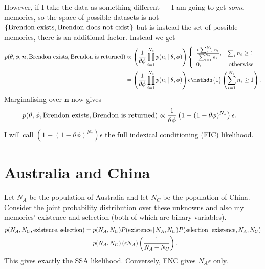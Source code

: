 \documentclass[a4paper, 12pt]{article}
\newcommand{\given}{\,|\,}
\begin{document}
However, if I take the data as something different --- I am going to get
{\em some} memories, so the space of possible datasets is not
$\{\textnormal{Brendon exists}, \textnormal{Brendon does not exist}\}$
but is instead the set of possible memories, there is an additional factor.
Instead we get 
\begin{align}
p(\theta, \phi, \boldsymbol{n}, \textnormal{Brendon exists},
  \textnormal{Brendon is returned}) &\propto
    \left(\frac{1}{\theta\phi}\prod_{i=1}^{N_*} p(n_i \given \theta, \phi)\right)
    \left\{
        \begin{array}{lr}
         \frac{\epsilon\sum_{i=1}^{N_*} n_i}{\sum_{i=1}^{N_*} n_i}, & \sum_i n_i \geq 1 \\
        0, & \textnormal{otherwise}
        \end{array}
    \right.\\
    &= \left(\frac{1}{\theta\phi}\prod_{i=1}^{N_*} p(n_i \given \theta, \phi)\right)
    \epsilon\mathds{1}\left(\sum_{i=1}^{N_*} n_i \geq 1\right).
\end{align}
Marginalising over $\boldsymbol{n}$ now gives
\begin{align}
p(\theta, \phi, \textnormal{Brendon exists},
  \textnormal{Brendon is returned}) &\propto
    \frac{1}{\theta\phi}
    \left(1 - (1 - \theta\phi)^{N_*}\right)
\epsilon.
\end{align}
I will call $\left(1 - (1 - \theta\phi)^{N_*}\right)\epsilon$ the full indexical
conditioning (FIC) likelihood.

\section{Australia and China}
Let $N_A$ be the population of Australia and let $N_C$ be the population of
China. Consider the joint probability distribution over these unknowns
and also my memories' existence and selection (both of which are binary
variables).
\begin{align}
p(N_A, N_C, \textnormal{existence}, \textnormal{selection})
    &= p(N_A, N_C)P(\textnormal{existence} \given N_A, N_C)
            P(\textnormal{selection} \given \textnormal{existence}, N_A, N_C)\\
    &= p(N_A, N_C)\left(\epsilon N_A\right)
            \left(\frac{1}{N_A + N_C}\right).
\end{align}
This gives exactly the SSA likelihood. Conversely, FNC gives $N_A\epsilon$
only.
\end{document}
